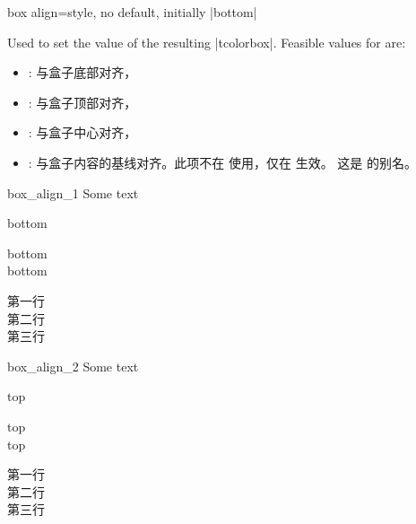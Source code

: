 \begin{docTcbKey}[][doc new=2014-10-10]{box align}{=}{style, no default, initially |bottom|}

  Used to set the  value of the resulting |tcolorbox|.
  Feasible values for  are:  
  \begin{itemize}
  \item{}: %
  与盒子底部对齐，
  \item{}: %
  与盒子顶部对齐，
  \item{}: %
  与盒子中心对齐，
  \item{}: 
  与盒子内容的基线对齐。此项不在  使用，仅在  生效。
这是  的别名。
  \end{itemize}

\begin{exdispExample}{box_align_1}
Some text\dotfill
\begin{tcolorbox}[box align=bottom]
  bottom
\end{tcolorbox}
\begin{tcolorbox}[box align=bottom]
  bottom\\bottom
\end{tcolorbox}
\begin{tcolorbox}
第一行\\第二行\\第三行
\end{tcolorbox}
\end{exdispExample}

\begin{exdispExample}{box_align_2}
Some text\dotfill
\begin{tcolorbox}[box align=top]
  top
\end{tcolorbox}
\begin{tcolorbox}[box align=top]
  top\\top
\end{tcolorbox}
\begin{tcolorbox}
第一行\\第二行\\第三行
\end{tcolorbox}
\end{exdispExample}


\end{docTcbKey}
